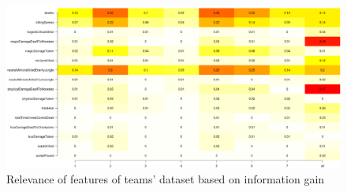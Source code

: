 \begin{figure}
\includegraphics[width=1\textwidth,height=\textheight,keepaspectratio]{relevance}
\caption{Relevance of features of teams' dataset based on information gain}
\label{fig:relevance}
\end{figure}

